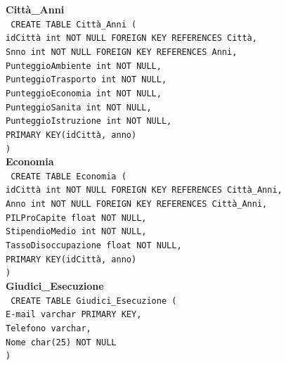 \documentclass[a4paper,12pt]{report}
\begin{document}
                \noindent
                {\large \textbf{Città\_Anni}} \\
                \texttt{
                    CREATE TABLE Città\_Anni ( \\
                    \null\quad\quad idCittà int NOT NULL FOREIGN KEY REFERENCES Città, \\
                    \null\quad\quad Snno int NOT NULL FOREIGN KEY REFERENCES Anni, \\
                    \null\quad\quad PunteggioAmbiente       int     NOT NULL, \\
                    \null\quad\quad PunteggioTrasporto      int     NOT NULL, \\
                    \null\quad\quad PunteggioEconomia       int     NOT NULL, \\
                    \null\quad\quad PunteggioSanita         int     NOT NULL, \\
                    \null\quad\quad PunteggioIstruzione     int     NOT NULL, \\
                    \null\quad\quad PRIMARY KEY(idCittà, anno) \\
                    )
                } \\

                \noindent
                {\large \textbf{Economia}} \\
                \texttt{
                    CREATE TABLE Economia ( \\
                    \null\quad\quad idCittà int NOT NULL FOREIGN KEY REFERENCES Città\_Anni, \\
                    \null\quad\quad Anno int NOT NULL FOREIGN KEY REFERENCES Città\_Anni, \\
                    \null\quad\quad PILProCapite float NOT NULL, \\
                    \null\quad\quad StipendioMedio int NOT NULL, \\
                    \null\quad\quad TassoDisoccupazione float NOT NULL, \\
                    \null\quad\quad PRIMARY KEY(idCittà, anno) \\
                    )
                } \\

                \noindent
                {\large \textbf{Giudici\_Esecuzione}} \\
                \texttt{
                    CREATE TABLE Giudici\_Esecuzione ( \\
                    \null\quad\quad E-mail varchar PRIMARY KEY, \\
                    \null\quad\quad Telefono varchar, \\
                    \null\quad\quad Nome char(25) NOT NULL \\
                    )
                } \\
\end{document}
